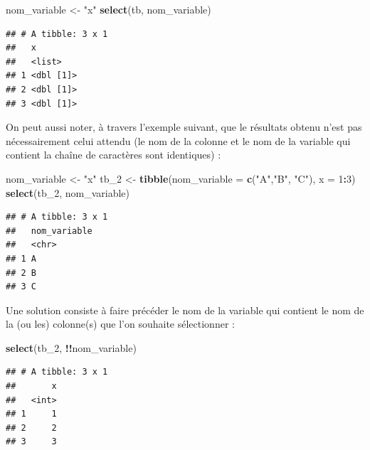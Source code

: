 \documentclass[
  11pt,
]{book}
\newenvironment{Shaded}{\begin{snugshade}}{\end{snugshade}}
\newcommand{\DataTypeTok}[1]{\textcolor[rgb]{0.13,0.29,0.53}{#1}}
\newcommand{\DecValTok}[1]{\textcolor[rgb]{0.00,0.00,0.81}{#1}}
\newcommand{\KeywordTok}[1]{\textcolor[rgb]{0.13,0.29,0.53}{\textbf{#1}}}
\newcommand{\NormalTok}[1]{#1}
\newcommand{\OperatorTok}[1]{\textcolor[rgb]{0.81,0.36,0.00}{\textbf{#1}}}
\newcommand{\StringTok}[1]{\textcolor[rgb]{0.31,0.60,0.02}{#1}}
\numberwithin{equation}{section}
\numberwithin{countremarque}{section}
\begin{document}
\begin{Shaded}
\begin{Highlighting}[]
\NormalTok{nom\_variable \textless{}{-}}\StringTok{ "x"}
\KeywordTok{select}\NormalTok{(tb, nom\_variable)}
\end{Highlighting}
\end{Shaded}

\begin{lstlisting}
## # A tibble: 3 x 1
##   x        
##   <list>   
## 1 <dbl [1]>
## 2 <dbl [1]>
## 3 <dbl [1]>
\end{lstlisting}

On peut aussi noter, à travers l'exemple suivant, que le résultats obtenu n'est pas nécessairement celui attendu (le nom de la colonne et le nom de la variable qui contient la chaîne de caractères sont identiques) :

\begin{Shaded}
\begin{Highlighting}[]
\NormalTok{nom\_variable \textless{}{-}}\StringTok{ "x"}
\NormalTok{tb\_}\DecValTok{2}\NormalTok{ \textless{}{-}}\StringTok{ }\KeywordTok{tibble}\NormalTok{(}\DataTypeTok{nom\_variable =} \KeywordTok{c}\NormalTok{(}\StringTok{"A"}\NormalTok{,}\StringTok{"B"}\NormalTok{, }\StringTok{"C"}\NormalTok{), }\DataTypeTok{x =} \DecValTok{1}\OperatorTok{:}\DecValTok{3}\NormalTok{)}
\KeywordTok{select}\NormalTok{(tb\_}\DecValTok{2}\NormalTok{, nom\_variable)}
\end{Highlighting}
\end{Shaded}

\begin{lstlisting}
## # A tibble: 3 x 1
##   nom_variable
##   <chr>       
## 1 A           
## 2 B           
## 3 C
\end{lstlisting}

Une solution consiste à faire précéder le nom de la variable qui contient le nom de la (ou les) colonne(s) que l'on souhaite sélectionner :

\begin{Shaded}
\begin{Highlighting}[]
\KeywordTok{select}\NormalTok{(tb\_}\DecValTok{2}\NormalTok{, }\OperatorTok{!!}\NormalTok{nom\_variable)}
\end{Highlighting}
\end{Shaded}

\begin{lstlisting}
## # A tibble: 3 x 1
##       x
##   <int>
## 1     1
## 2     2
## 3     3
\end{lstlisting}
\end{document}
